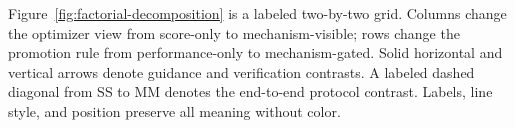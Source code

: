 Figure~\ref{fig:factorial-decomposition} is a labeled two-by-two grid.  Columns
change the optimizer view from score-only to mechanism-visible; rows change the
promotion rule from performance-only to mechanism-gated.  Solid horizontal and
vertical arrows denote guidance and verification contrasts.  A labeled dashed
diagonal from SS to MM denotes the end-to-end protocol contrast.  Labels, line
style, and position preserve all meaning without color.
